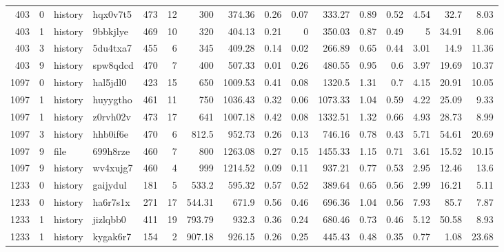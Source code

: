 \documentclass[9pt,twoside,lineno]{pnas-new}
\begin{document}
\begin{table}
\begin{tabular}{rrllrrrrrrrrrrrr}
  403 &   0 & history  & hqx0v7t5 & 473 &    12 &   300    &  374.36 &      0.26 &       0.07 &  333.27 & 0.89 &  0.52 &   4.54 &  32.7  &        8.03 \\
  403 &   1 & history  & 9bbkjlye & 469 &    10 &   320    &  404.13 &      0.21 &       0    &  350.03 & 0.87 &  0.49 &   5    &  34.91 &        8.06 \\
  403 &   3 & history  & 5du4txa7 & 455 &     6 &   345    &  409.28 &      0.14 &       0.02 &  266.89 & 0.65 &  0.44 &   3.01 &  14.9  &       11.36 \\
  403 &   9 & history  & spw8qdcd & 470 &     7 &   400    &  507.33 &      0.01 &       0.26 &  480.55 & 0.95 &  0.6  &   3.97 &  19.69 &       10.37 \\
 1097 &   0 & history  & hal5jdl0 & 423 &    15 &   650    & 1009.53 &      0.41 &       0.08 & 1320.5  & 1.31 &  0.7  &   4.15 &  20.91 &       10.05 \\
 1097 &   1 & history  & huyygtho & 461 &    11 &   750    & 1036.43 &      0.32 &       0.06 & 1073.33 & 1.04 &  0.59 &   4.22 &  25.09 &        9.33 \\
 1097 &   1 & history  & z0rvh02v & 473 &    17 &   641    & 1007.18 &      0.42 &       0.08 & 1332.51 & 1.32 &  0.66 &   4.93 &  28.73 &        8.99 \\
 1097 &   3 & history  & hhb0if6e & 470 &     6 &   812.5  &  952.73 &      0.26 &       0.13 &  746.16 & 0.78 &  0.43 &   5.71 &  54.61 &       20.69 \\
 1097 &   9 & file     & 699h8rze & 460 &     7 &   800    & 1263.08 &      0.27 &       0.15 & 1455.33 & 1.15 &  0.71 &   3.61 &  15.52 &       10.15 \\
 1097 &   9 & history  & wv4xujg7 & 460 &     4 &   999    & 1214.52 &      0.09 &       0.11 &  937.21 & 0.77 &  0.53 &   2.95 &  12.46 &       13.6  \\
 1233 &   0 & history  & gaijydul & 181 &     5 &   533.2  &  595.32 &      0.57 &       0.52 &  389.64 & 0.65 &  0.56 &   2.99 &  16.21 &        5.11 \\
 1233 &   0 & history  & ha6r7s1x & 271 &    17 &   544.31 &  671.9  &      0.56 &       0.46 &  696.36 & 1.04 &  0.56 &   7.93 &  85.7  &        7.87 \\
 1233 &   1 & history  & jizlqbb0 & 411 &    19 &   793.79 &  932.3  &      0.36 &       0.24 &  680.46 & 0.73 &  0.46 &   5.12 &  50.58 &        8.93 \\
 1233 &   1 & history  & kygak6r7 & 154 &     2 &   907.18 &  926.15 &      0.26 &       0.25 &  445.43 & 0.48 &  0.35 &   0.77 &   1.08 &       23.68 \\

\end{tabular}
\end{table}
\end{document}
